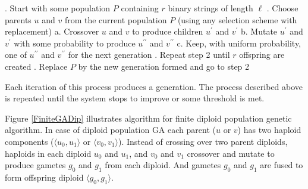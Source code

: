 \begin{algorithm}
\caption*{}
\begin{algorithmic}[1]
. Start with some population $P$ containing $r$ binary strings of length $\ell$
. Choose parents $u$ and $v$ from the current population $P$ (using any selection scheme with replacement)
  \Statex \hspace{\algorithmicindent} a. Crossover $u$ and $v$ to produce children $u^\prime$ and $v^\prime$
  \Statex \hspace{\algorithmicindent} b. Mutate $u^\prime$ and $v^\prime$ with some probability to produce $u^{\prime\prime}$ and $v^{\prime\prime}$
  \Statex \hspace{\algorithmicindent} c. Keep, with uniform probability, one of $u^{\prime\prime}$ and $v^{\prime\prime}$ for the next generation 
. Repeat step 2 until $r$ offspring are created
. Replace $P$ by the new generation formed and go to step 2
\end{algorithmic}
\label{RealGA}
\end{algorithm}

Each iteration of this process produces a generation. 
The process described above is repeated until the system stops to improve or some threshold is met. 

Figure \ref{FiniteGADip} illustrates 
algorithm for finite diploid population genetic algorithm. 
In case of diploid population GA each parent ($u$ or $v$) 
has two haploid components ($\langle u_0, u_1 \rangle$ or $\langle v_0, v_1 \rangle$). 
Instead of crossing over two parent diploids, 
haploids in each diploid $u_0$ and $u_1$, and $v_0$ and $v_1$ 
crossover and mutate to produce gametes $g_0$ and $g_1$ from  each diploid. 
And gametes $g_0$ and $g_1$ are fused to form offspring diploid $ \langle g_0, g_1 \rangle $.

